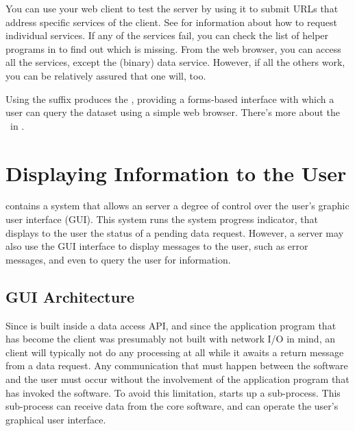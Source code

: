 You can use your web client to test the \opendap server by using it to
submit URLs that address specific services of the client.  See
 for information about how to request
individual services.  If any of the services fail, you can check the
list of helper programs in  to find
out which is missing.  From the web browser, you can access all the
\opendap services, except the (binary) data service.  However, if all the
others work, you can be relatively assured that one will, too.

Using the  suffix produces the \ind{\ifh}, providing a
forms-based interface with which a user can query the dataset using a
simple web browser.  There's more about the \ifh\ in
. 

\section{Displaying Information to the \opendap User}
\label{opd-server,display}

 \opendap contains a system that
allows an \opendap server a degree of control over the user's graphic user
interface (GUI).  This system runs the
system progress indicator, that displays to the user the status of a
pending data request. However, a server may also use the GUI interface
to display messages to the user, such as error messages, and even to
query the user for information.

\subsection{GUI Architecture}
\label{opd-server,gui}

 
Since \opendap is built inside a data access API, and since the
application program that has become the \opendap client was presumably not
built with network I/O in mind, an \opendap client will typically not do
any processing at all while it awaits a return message from a data
request. Any communication that must happen between the \opendap software
and the user must occur without the involvement of the application
program that has invoked the \opendap software. To avoid this limitation,
\opendap starts up a  sub-process. This sub-process can
receive data from the \opendap core software, and can operate the user's
graphical user interface.    

